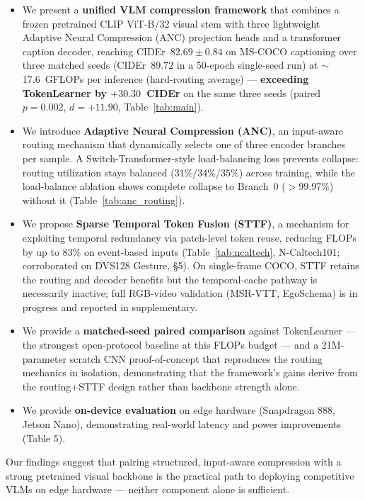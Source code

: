 \documentclass{article}
\begin{document}
\begin{itemize}
\item We present a \textbf{unified VLM compression framework} that combines a frozen pretrained CLIP ViT-B/32 visual stem with three lightweight Adaptive Neural Compression (ANC) projection heads and a transformer caption decoder, reaching CIDEr~$\mathbf{82.69 \pm 0.84}$ on MS-COCO captioning over three matched seeds (CIDEr~$89.72$ in a 50-epoch single-seed run) at $\sim$17.6~GFLOPs per inference (hard-routing average) — \textbf{exceeding TokenLearner by $+30.30$~CIDEr} on the same three seeds (paired $p{=}0.002$, $d{=}{+}11.90$, Table~\ref{tab:main}).

\item We introduce \textbf{Adaptive Neural Compression (ANC)}, an input-aware routing mechanism that dynamically selects one of three encoder branches per sample. A Switch-Transformer-style load-balancing loss prevents collapse: routing utilization stays balanced ($31\%$/$34\%$/$35\%$) across training, while the load-balance ablation shows complete collapse to Branch~0 ($>$99.97\%) without it (Table~\ref{tab:anc_routing}).

\item We propose \textbf{Sparse Temporal Token Fusion (STTF)}, a mechanism for exploiting temporal redundancy via patch-level token reuse, reducing FLOPs by up to $83\%$ on event-based inputs (Table~\ref{tab:ncaltech}, N-Caltech101; corroborated on DVS128 Gesture, §5). On single-frame COCO, STTF retains the routing and decoder benefits but the temporal-cache pathway is necessarily inactive; full RGB-video validation (MSR-VTT, EgoSchema) is in progress and reported in supplementary.

\item We provide a \textbf{matched-seed paired comparison} against TokenLearner — the strongest open-protocol baseline at this FLOPs budget — and a 21M-parameter scratch CNN proof-of-concept that reproduces the routing mechanics in isolation, demonstrating that the framework's gains derive from the routing+STTF design rather than backbone strength alone.

\item We provide \textbf{on-device evaluation} on edge hardware (Snapdragon 888, Jetson Nano), demonstrating real-world latency and power improvements (Table 5).
\end{itemize}

Our findings suggest that pairing structured, input-aware compression with a strong pretrained visual backbone is the practical path to deploying competitive VLMs on edge hardware — neither component alone is sufficient.
\end{document}
